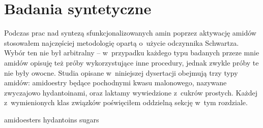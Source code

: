 \chapter{Badania syntetyczne}\label{chapter:synthesis}

Podczas prac nad syntezą sfunkcjonalizowanych amin poprzez aktywację amidów
  stosowałem najczęściej metodologię opartą o~użycie odczynnika Schwartza.
Wybór ten nie był arbitralny \--- w~przypadku każdego typu badanych przeze mnie
  amidów opisuję też próby wykorzystujące inne procedury,
  jednak zwykle próby te nie były owocne.
Studia opisane w~niniejszej dysertacji obejmują trzy typy amidów:
  amidoestry będące pochodnymi kwasu malonowego,
   nazywane zwyczajowo hydantoinami,
  oraz laktamy wywiedzione z~cukrów prostych.
Każdej z~wymienionych klas związków poświęciłem oddzielną sekcję w~tym rozdziale.

{amidoesters}
{hydantoins}
{sugars}
